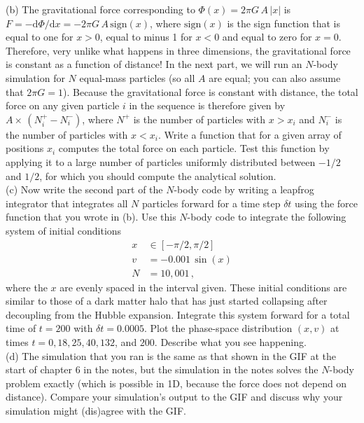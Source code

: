 \documentclass[12pt]{article}
\begin{document}
(b) The gravitational force corresponding to $\Phi(x) = 2\pi
G\,A\,|x|$ is $F = -\mathrm{d} \Phi / \mathrm{d} x = -2\pi
G\,A\,\mathrm{sign}(x)$, where $\mathrm{sign}(x)$ is the sign function
that is equal to one for $x > 0$, equal to minus 1 for $x < 0$ and
equal to zero for $x=0$. Therefore, very unlike what happens in three
dimensions, the gravitational force is constant as a function of
distance! In the next part, we will run an $N$-body simulation for $N$
equal-mass particles (so all $A$ are equal; you can also assume that
$2\pi G = 1$). Because the gravitational force is constant with
distance, the total force on any given particle $i$ in the sequence is
therefore given by $A\times\,(N^+_i-N^-_i)$, where $N^+$ is the number
of particles with $x > x_i$ and $N^-_i$ is the number of particles
with $x < x_i$. Write a function that for a given array of positions
$x_i$ computes the total force on each particle. Test this function by
applying it to a large number of particles uniformly distributed
between $-1/2$ and $1/2$, for which you should compute the analytical
solution.\\

(c) Now write the second part of the $N$-body code by writing a
leapfrog integrator that integrates all $N$ particles forward for a
time step $\delta t$ using the force function that you wrote in
(b). Use this $N$-body code to integrate the following system of
initial conditions
\begin{align}
  x & \in [-\pi/2,\pi/2]\\
  v &= -0.001\,\sin(x)\\
  N & = 10,001\,,
\end{align}
where the $x$ are evenly spaced in the interval given. These initial
conditions are similar to those of a dark matter halo that has just
started collapsing after decoupling from the Hubble
expansion. Integrate this system forward for a total time of $t = 200$
with $\delta t = 0.0005$. Plot the phase-space distribution $(x,v)$ at
times $t=0, 18, 25, 40, 132$, and $200$. Describe what you see
happening.\\

(d) The simulation that you ran is the same as that shown in the GIF
at the start of chapter 6 in the notes, but the simulation in the
notes solves the $N$-body problem exactly (which is possible in 1D,
because the force does not depend on distance). Compare your
simulation's output to the GIF and discuss why your simulation might
(dis)agree with the GIF.\\
\end{document}
